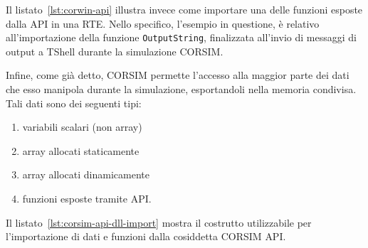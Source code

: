 
Il listato~\ref{lst:corwin-api} illustra invece come importare una delle funzioni esposte dalla  \acs{API} in una \acs{RTE}. Nello specifico, l'esempio in questione, è relativo all'importazione della funzione \lstinline[]|OutputString|, finalizzata all'invio di messaggi di output a \acs{TShell} durante la simulazione \acs{CORSIM}.

\vspace*{8pt}

Infine, come già detto, \acs{CORSIM} permette l'accesso alla maggior parte dei dati che esso manipola durante la simulazione, esportandoli nella memoria condivisa. Tali dati sono dei seguenti tipi:
\begin{enumerate}
    \item variabili scalari (non array)
    \item array allocati staticamente
    \item array allocati dinamicamente
    \item funzioni esposte tramite \acs{API}.
\end{enumerate}

Il listato~\ref{lst:corsim-api-dll-import} mostra il costrutto utilizzabile per l'importazione di dati e funzioni dalla cosiddetta \acs{CORSIM} \acs{API}.
\vspace*{8pt}

